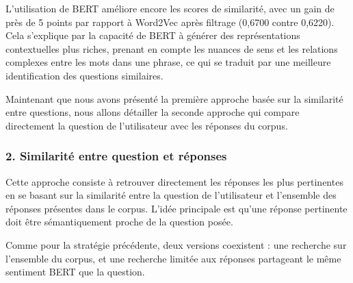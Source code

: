 \documentclass[12pt,a4paper]{report}
\begin{document}
\begin{note}
L'utilisation de BERT améliore encore les scores de similarité, avec un gain de près de 5 points par rapport à Word2Vec après filtrage (0,6700 contre 0,6220). 
Cela s'explique par la capacité de BERT à générer des représentations contextuelles plus riches, prenant en compte les nuances de sens et les relations complexes entre les mots dans une phrase, 
ce qui se traduit par une meilleure identification des questions similaires.
\end{note}

\vspace{0.5cm}
Maintenant que nous avons présenté la première approche basée sur la similarité entre questions, nous allons détailler la seconde approche qui compare directement la question de l'utilisateur avec les réponses du corpus.

\pagebreak

\subsubsection{2. Similarité entre question et réponses}

Cette approche consiste à retrouver directement les réponses les plus pertinentes en se basant sur la similarité entre la question de l'utilisateur et l'ensemble des réponses présentes dans le corpus. L'idée principale est qu'une réponse pertinente doit être sémantiquement proche de la question posée.

Comme pour la stratégie précédente, deux versions coexistent : une recherche sur l'ensemble du corpus, et une recherche limitée aux réponses partageant le même sentiment BERT que la question.
\end{document}
